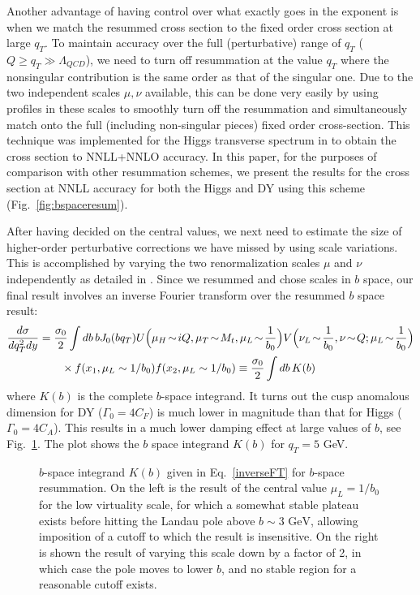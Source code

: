 \documentclass[a4,letterpaper,11pt]{article}
\newcommand{\nn}{\nonumber}
\newcommand{\eq}[1]{Eq.~\eqref{#1}}
\newcommand{\fig}[1]{Fig.~\ref{fig:#1}}
\begin{document}
Another advantage of having control over what exactly goes in the exponent is when we match the resummed cross section to the fixed order cross section at large $q_T$. 
To maintain accuracy over the full (perturbative) range of $q_T$ ($Q \geq q_T \gg  \Lambda_{QCD}$), we need to turn off resummation at the value $q_T$ where the nonsingular contribution is the same order as that of the singular one. Due to the two independent scales $\mu,\nu$ available, this can be done very easily by using profiles in these scales to smoothly turn off the resummation and simultaneously match onto the full (including non-singular pieces) fixed order cross-section. This technique was implemented for the Higgs transverse spectrum in \cite{Neill:2015roa} to obtain the cross section to NNLL+NNLO accuracy. In this paper, for the purposes of comparison with other resummation schemes, we present the results for the cross section at NNLL accuracy for both the Higgs and DY using this scheme (\fig{bspaceresum}).

After having decided on the central values, we next need to estimate the size of higher-order perturbative corrections we have missed by using scale variations. This is accomplished by varying the two renormalization scales $\mu $ and $\nu$ independently as detailed in \cite{Neill:2015roa}. 
Since we resummed and chose scales in $b$ space, our final result involves an inverse Fourier transform over the resummed $b$ space result:
\begin{align}
\label{inverseFT}
\frac{d\sigma}{dq_T^2 dy} &= \frac{\sigma_0}{2} \int db\, bJ_0(bq_T)  U\Bigl(\mu_H \!\sim\! i Q, \mu_T \!\sim\! M_t, \mu_L \!\sim\! \frac{1}{b_0}\Bigr)  V\Bigl(\nu_L \!\sim \!\frac{1}{b_0},\nu \!\sim\! Q;\mu_L\! \sim\! \frac{1}{b_0}\Bigr)\nn\\
&\qquad \times f(x_1,\mu_L\sim1/b_0)f(x_2,\mu_L\sim 1/b_0) \equiv \frac{\sigma_0}{2} \int db\,   K(b)
\end{align}
where $K(b)$ is the complete $b$-space integrand. It turns out the cusp anomalous dimension for DY ($\Gamma_0 = 4C_F$) is much lower in magnitude than that for Higgs ($\Gamma_0 = 4C_A$). This results in a much lower damping effect at large values of $b$, see \fig{bspace}. The plot shows the $b$ space integrand $K(b)$ for $q_T= 5$ GeV.


\begin{figure}
\centerline{}
\vskip-0.4cm
\caption[1]{$b$-space integrand $K(b)$ given in \eq{inverseFT} for $b$-space resummation. On the left is the result of the central value $\mu_L=1/b_0$ for the low virtuality scale, for which a somewhat stable plateau exists before hitting the Landau pole above $b\sim 3\text{ GeV}$, allowing imposition of a cutoff to which the result is insensitive. On the right is shown the result of varying this scale down by a factor of 2, in which case the pole moves to lower $b$, and no stable region for a reasonable cutoff exists.}
\label{fig:bspace} 
\end{figure}
\end{document}
